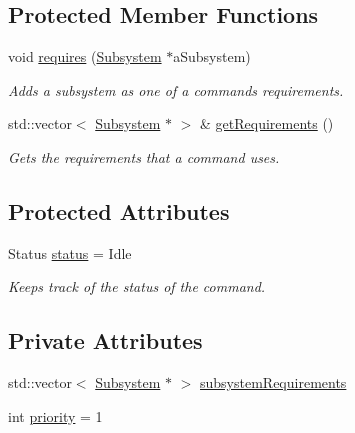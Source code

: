 \subsection*{Protected Member Functions}
\begin{DoxyCompactItemize}
\item 
void \mbox{\hyperlink{classlib_iterative_robot_1_1_command_ad7b7f328974f5f17a2a4b1593b6c9eb5}{requires}} (\mbox{\hyperlink{classlib_iterative_robot_1_1_subsystem}{Subsystem}} $\ast$a\+Subsystem)
\begin{DoxyCompactList}\small\item\em Adds a subsystem as one of a command\textquotesingle{}s requirements. \end{DoxyCompactList}\item 
std\+::vector$<$ \mbox{\hyperlink{classlib_iterative_robot_1_1_subsystem}{Subsystem}} $\ast$ $>$ \& \mbox{\hyperlink{classlib_iterative_robot_1_1_command_a447ba6e394f165c6d358471a8bbdc76a}{get\+Requirements}} ()
\begin{DoxyCompactList}\small\item\em Gets the requirements that a command uses. \end{DoxyCompactList}\end{DoxyCompactItemize}
\subsection*{Protected Attributes}
\begin{DoxyCompactItemize}
\item 
\mbox{\label{classlib_iterative_robot_1_1_command_a54548a957a6b4097837c41fcc660467e}} 
Status \mbox{\hyperlink{classlib_iterative_robot_1_1_command_a54548a957a6b4097837c41fcc660467e}{status}} = Idle
\begin{DoxyCompactList}\small\item\em Keeps track of the status of the command. \end{DoxyCompactList}\end{DoxyCompactItemize}
\subsection*{Private Attributes}
\begin{DoxyCompactItemize}
\item 
std\+::vector$<$ \mbox{\hyperlink{classlib_iterative_robot_1_1_subsystem}{Subsystem}} $\ast$ $>$ \mbox{\hyperlink{classlib_iterative_robot_1_1_command_abbedf025246921d5cde67aa954b74d35}{subsystem\+Requirements}}
\item 
int \mbox{\hyperlink{classlib_iterative_robot_1_1_command_af2fd312376da33f5eba582db90389511}{priority}} = 1
\end{DoxyCompactItemize}
